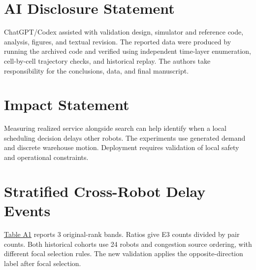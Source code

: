 \documentclass{article}
\begin{document}
\section*{AI Disclosure Statement}
ChatGPT/Codex assisted with validation design, simulator and reference code, analysis, figures, and textual revision. The reported data were produced by running the archived code and verified using independent time-layer enumeration, cell-by-cell trajectory checks, and historical replay. The authors take responsibility for the conclusions, data, and final manuscript.

\section*{Impact Statement}
Measuring realized service alongside search can help identify when a local scheduling decision delays other robots. The experiments use generated demand and discrete warehouse motion. Deployment requires validation of local safety and operational constraints.


\clearpage\onecolumn\appendix\raggedbottom
\section{Stratified Cross-Robot Delay Events}
\hyperlink{display:TableA1}{Table A1} reports 3 original-rank bands. Ratios give E3 counts divided by pair counts. Both historical cohorts use 24 robots and congestion source ordering, with different focal selection rules. The new validation applies the opposite-direction label after focal selection.
\end{document}
